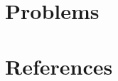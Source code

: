 \documentclass[11pt]{article}
\begin{document}
\section{Problems}
\label{sec:org751b553}


\section{References}
\label{sec:org48c2950}
\label{bibliographystyle link}



\end{document}
